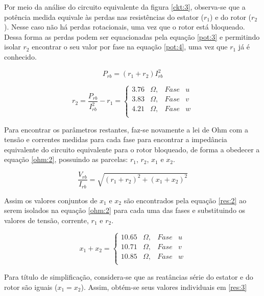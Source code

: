 Por meio da análise do circuito equivalente da figura \ref{ckt:3}, observa-se que a potência medida equivale às perdas nas resistências do estator ($r_1$) e do rotor ($r_2$). Nesse caso não há perdas rotacionais, uma vez que o rotor está bloqueado. Dessa forma as perdas podem ser equacionadas pela equação \ref{pot:3} e permitindo isolar $r_2$ encontrar o seu valor por fase na equação \ref{pot:4}, uma vez que $r_1$ já é conhecido.

\begin{equation} \label{pot:3}
P_{rb} = (r_1+r_2)I_{rb}^2 
\end{equation}

\begin{equation} \label{pot:4}
r_2 = \frac{P_{rb}}{I_{rb}^2}-r_1 =  
\left \{
\begin{array}{clcl}
3.76&\Omega, & Fase&u \\
3.83&\Omega, & Fase&v \\
4.21&\Omega, & Fase&w \\
\end{array}
\right.
\end{equation}

Para encontrar os parâmetros restantes, faz-se novamente a lei de Ohm com a tensão e correntes medidas para cada fase para encontrar a impedância equivalente do circuito equivalente para o rotor bloqueado, de forma a obedecer a equação \ref{ohm:2}, possuindo as parcelas: $r_1$, $r_2$, $x_1$ e $x_2$.

\begin{equation} \label{ohm:2}
\frac{V_{rb}}{I_{rb}} = \sqrt{(r_1+r_2)^2+(x_1+x_2)^2} 
\end{equation}

Assim os valores conjuntos de $x_1$ e $x_2$ são encontrados pela equação \ref{res:2} ao serem isolados na equação \ref{ohm:2} para cada uma das fases e substituindo os valores de tensão, corrente, $r_1$ e $r_2$. 

\begin{equation} \label{res:2}
x_1 + x_2 =  
\left \{
\begin{array}{clcl}
10.65&\Omega, & Fase&u \\
10.71&\Omega, & Fase&v \\
10.85&\Omega, & Fase&w \\
\end{array}
\right.
\end{equation}

Para título de simplificação, considera-se que as reatâncias série do estator e do rotor são iguais ($x_1=x_2$). Assim, obtém-se seus valores individuais em \ref{res:3}

